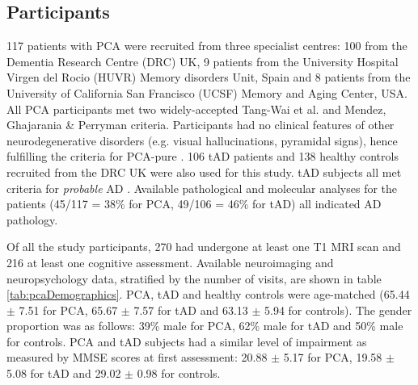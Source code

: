 \subsection{Participants}
\label{sec:pcaParticipants}

117 patients with PCA were recruited from three specialist centres: 100 from the Dementia Research Centre (DRC) UK, 9 patients from the University Hospital Virgen del Rocio (HUVR) Memory disorders Unit, Spain and 8 patients from the University of California San Francisco (UCSF) Memory and Aging Center, USA. All PCA participants met two widely-accepted Tang-Wai et al. \cite{tang2004clinical} and Mendez, Ghajarania \& Perryman \cite{mendez2002posterior} criteria. Participants had no clinical features of other neurodegenerative disorders (e.g. visual hallucinations, pyramidal signs), hence fulfilling the criteria for PCA-pure \cite{crutch2017consensus}. 106 tAD patients and 138 healthy controls recruited from the DRC UK were also used for this study. tAD subjects all met criteria for \emph{probable} AD \cite{mckhann2011diagnosis}. Available pathological and molecular analyses for the patients (45/117 = 38\% for PCA, 49/106  = 46\% for tAD) all indicated AD pathology. 

Of all the study participants, 270 had undergone at least one T1 MRI scan and 216 at least one cognitive assessment. Available neuroimaging and neuropsychology data, stratified by the number of visits, are shown in table \ref{tab:pcaDemographics}. PCA, tAD and healthy controls were age-matched (65.44 $\pm$ 7.51 for PCA, 65.67 $\pm$ 7.57 for tAD and 63.13 $\pm$ 5.94 for controls). The gender proportion was as follows: 39\% male for PCA, 62\% male for tAD and 50\% male for controls. PCA and tAD subjects had a similar level of impairment as measured by MMSE scores at first assessment: 20.88 $\pm$ 5.17 for PCA, 19.58 $\pm$ 5.08 for tAD and 29.02 $\pm$ 0.98 for controls. 

\newcommand{\tabwidth}{1cm}

